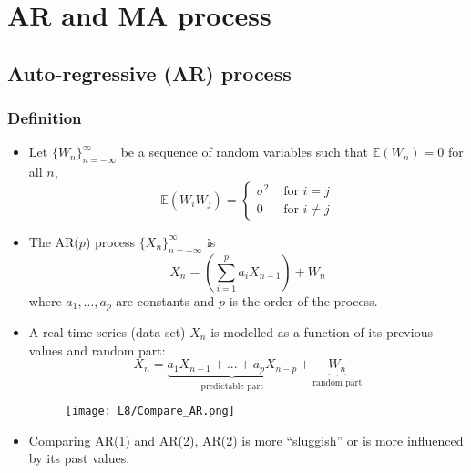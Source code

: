 \documentclass[12pt]{article}
\newcommand{\sigd}{\sigma^2}
\newcommand{\mexpval}[1]{\mathbb{E}(#1)}
\newcommand{\summ}[2]{\sum_{#1}^{#2}}
\newcommand{\arproc}[1]{$\{#1_n \}_{n=-\infty}^{\infty}$}
\begin{document}
\section{AR and MA process}
\subsection{Auto-regressive (AR) process}
\subsubsection{Definition}
\begin{itemize}
    \item Let \arproc{W} be a sequence of random variables such that $\mexpval{W_n} = 0$ for all $n$, 
\[
\mexpval{W_i W_j} = \left\{\begin{array}{cc}
   \sigd  & \textrm{ for } i=j \\
   0  & \textrm{ for } i \not =j
\end{array} \right.
\]
\item The AR($p$) process \arproc{X} is 
\[
X_n = \left( \summ{i=1}{p} a_i X_{n-1}\right) + W_n
\]
where $a_1,...,a_p$ are constants and $p$ is the order of the process.

\item A real time-series (data set) $X_n$ is modelled as a function of its previous values and random part:
\[
X_n = \underbrace{a_1X_{n-1} +...+a_p X_{n-p}}_{\textrm{predictable part}} + \underbrace{W_n}_{\textrm{random part}} 
\]
\begin{figure}[H]
    \centering
    \texttt{[image: L8/Compare\_AR.png]}
\end{figure}
\item Comparing AR(1) and AR(2), AR(2) is more ``sluggish'' or is more influenced by its past values.
\end{itemize}
\end{document}
